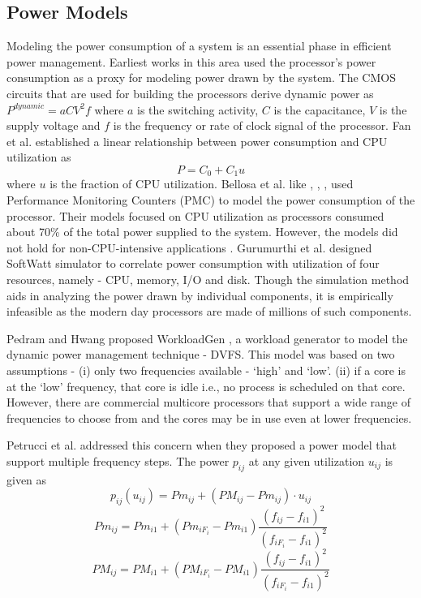 \documentclass{sig-alternate}
\begin{document}
\subsection{Power Models}
Modeling the power consumption of a system is an essential phase in efficient power management. Earliest works in this area used the processor's power consumption as a proxy for modeling power drawn by the system. The CMOS circuits
that are used for building the processors derive dynamic power as $P^{dynamic} = aCV^{2}f$ where $a$ is the switching activity, $C$ is the capacitance, $V$ is the supply voltage and $f$ is the frequency or rate of clock signal of the processor. Fan et al. \cite{Fan02} established a linear relationship between power consumption and CPU utilization as 
$$P = C_{0} + C_{1}u$$where $u$ is the fraction of CPU utilization. Bellosa et al. \cite{Bellosa} like \cite{Isci2003}, \cite{Bertrana}, \cite{Singh2009}, used Performance Monitoring Counters (PMC) to model the power consumption of the processor. Their models focused on CPU utilization as processors consumed about 70\% of the total power supplied to the system. However, the models did not hold for non-CPU-intensive applications \cite{Rivoire2008}. Gurumurthi et al. \cite{Gurumurthi2002} designed SoftWatt simulator to correlate power consumption with utilization of four resources, namely - CPU, memory, I/O and disk. Though the simulation method aids in analyzing the power drawn by individual components, it is empirically infeasible as the modern day processors are made of millions of such components. 

Pedram and Hwang proposed WorkloadGen \cite{Pedram2011}, a workload generator to model the dynamic power management technique - DVFS. This model was based on two assumptions - (i) only two frequencies available - `high' and `low'. (ii) if a core is at the `low' frequency, that core is idle i.e., no process is scheduled on that core. However, there are commercial multicore processors that support a wide range of frequencies to choose from and the cores may be in use even at lower frequencies.


Petrucci et al. \cite{Petrucci2011} addressed this concern when they proposed a power model that support multiple frequency steps. The power $p_{ij}$ at any given utilization $u_{ij}$ is given as 
$$p_{ij}(u_{ij}) = Pm_{ij} + (PM_{ij} - Pm_{ij}) \cdot u_{ij}$$
$$Pm_{ij} = Pm_{i1} + (Pm_{iF_i} - Pm_{i1})\frac{(f_{ij} - f_{i1})^2}{(f_{iF_i} - f_{i1})^2}$$ 
$$PM_{ij} = PM_{i1} + (PM_{iF_i} - PM_{i1})\frac{(f_{ij} - f_{i1})^2}{(f_{iF_i} - f_{i1})^2}$$
\end{document}
